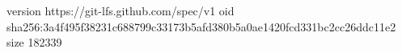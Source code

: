 version https://git-lfs.github.com/spec/v1
oid sha256:3a4f495f38231c688799c33173b5afd380b5a0ae1420fcd331bc2cc26ddc11e2
size 182339
